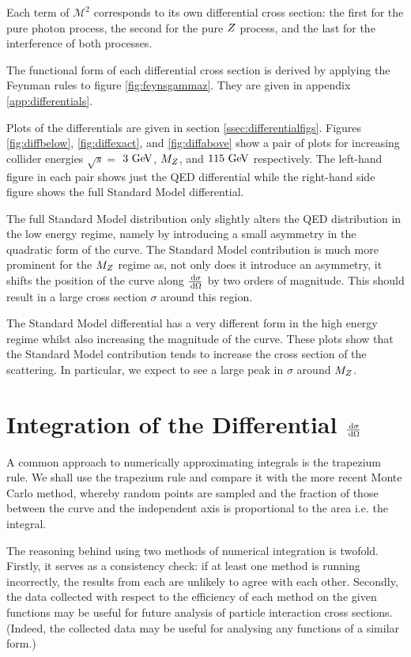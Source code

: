 \documentclass[]{article}
\begin{document}
Each term of $\mathcal{M}^{2}$ corresponds to its own differential cross section: the first for the pure photon process, the second for the pure $Z $ process, and the last for the interference of both processes.

The functional form of each differential cross section is derived by applying the Feynman rules to figure \ref{fig:feynsgammaz}. They are given in appendix \ref{app:differentials}.

Plots of the differentials are given in section \ref{ssec:differentialfigs}. Figures \ref{fig:diffbelow}, \ref{fig:diffexact}, and \ref{fig:diffabove} show a pair of plots for increasing collider energies $\sqrt{s}=$ $3\GeV$, $M_{Z }$, and $115\GeV$ respectively. The left-hand figure in each pair shows just the QED differential while the right-hand side figure shows the full Standard Model differential.

The full Standard Model distribution only slightly alters the QED distribution in the low energy regime, namely by introducing a small asymmetry in the quadratic form of the curve. The Standard Model contribution is much more prominent for the $M_{Z }$ regime as, not only does it introduce an asymmetry, it shifts the position of the curve along $\frac{\,\operatorname{d}\!{\sigma}}{\,\operatorname{d}\!{\Omega}}$ by two orders of magnitude. This should result in a large cross section $\sigma$ around this region.

The Standard Model differential has a very different form in the high energy regime whilst also increasing the magnitude of the curve. These plots show that the Standard Model contribution tends to increase the cross section of the scattering. In particular, we expect to see a large peak in $\sigma$ around $M_{Z }$.

\section{Integration of the Differential $\frac{\,\operatorname{d}\!{\sigma}}{\,\operatorname{d}\!{\Omega}}$}\label{sec:integration}

A common approach to numerically approximating integrals is the trapezium rule. We shall use the trapezium rule and compare it with the more recent Monte Carlo method, whereby random points are sampled and the fraction of those between the curve and the independent axis is proportional to the area i.e. the integral.

The reasoning behind using two methods of numerical integration is twofold. Firstly, it serves as a consistency check: if at least one method is running incorrectly, the results from each are unlikely to agree with each other. Secondly, the data collected with respect to the efficiency of each method on the given functions may be useful for future analysis of particle interaction cross sections. (Indeed, the collected data may be useful for analysing any functions of a similar form.)
\end{document}
